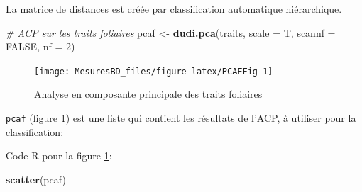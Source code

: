 \documentclass[
  11pt,
  french,
  a4paper,
  extrafontsizes,onecolumn,openright
  ]{memoir}
\newenvironment{Shaded}{\begin{snugshade}}{\end{snugshade}}
\newcommand{\AttributeTok}[1]{\textcolor[rgb]{0.13,0.29,0.53}{#1}}
\newcommand{\CommentTok}[1]{\textcolor[rgb]{0.56,0.35,0.01}{\textit{#1}}}
\newcommand{\ConstantTok}[1]{\textcolor[rgb]{0.56,0.35,0.01}{#1}}
\newcommand{\DecValTok}[1]{\textcolor[rgb]{0.00,0.00,0.81}{#1}}
\newcommand{\FunctionTok}[1]{\textcolor[rgb]{0.13,0.29,0.53}{\textbf{#1}}}
\newcommand{\NormalTok}[1]{#1}
\newcommand{\OtherTok}[1]{\textcolor[rgb]{0.56,0.35,0.01}{#1}}
\newcommand{\SpecialCharTok}[1]{\textcolor[rgb]{0.81,0.36,0.00}{\textbf{#1}}}
\newcommand{\StringTok}[1]{\textcolor[rgb]{0.31,0.60,0.02}{#1}}
\begin{document}
La matrice de distances est créée par classification automatique hiérarchique.

\scriptsize

\begin{Shaded}
\begin{Highlighting}[]
\CommentTok{\# ACP sur les traits foliaires}
\NormalTok{pcaf }\OtherTok{\textless{}{-}} \FunctionTok{dudi.pca}\NormalTok{(traits, }\AttributeTok{scale =}\NormalTok{ T, }\AttributeTok{scannf =} \ConstantTok{FALSE}\NormalTok{, }\AttributeTok{nf =} \DecValTok{2}\NormalTok{)}
\end{Highlighting}
\end{Shaded}

\normalsize

\scriptsize

\begin{figure}

{\centering \texttt{[image: MesuresBD\_files/figure-latex/PCAFFig-1]} 

}

\caption{Analyse en composante principale des traits foliaires}\label{fig:PCAFFig}
\end{figure}

\normalsize

\texttt{pcaf} (figure \ref{fig:PCAFFig}) est une liste qui contient les résultats de l'ACP, à utiliser pour la classification:

\scriptsize

\begin{Shaded}
\end{Shaded}

\normalsize

Code R pour la figure \ref{fig:PCAFFig}:

\scriptsize

\begin{Shaded}
\begin{Highlighting}[]
\FunctionTok{scatter}\NormalTok{(pcaf)}
\end{Highlighting}
\end{Shaded}

\normalsize

\scriptsize
\end{document}
